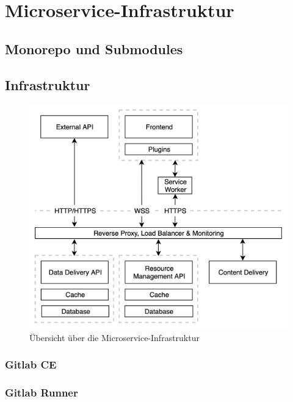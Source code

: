 \chapter{Microservice-Infrastruktur}
\label{chap:microserviceinfrastruktur}

\section{Monorepo und Submodules}
\label{sec:monorepoundsubmodules}

\section{Infrastruktur}
\label{sec:infrastruktur}

\begin{figure}
    \label{figure:microserviceinfrastruktur}
    \begin{center}
    \includegraphics[scale=0.2]{img/abbildungen/MicroserviceInfrastruktur}
    \end{center}
    \caption{Übersicht über die Microservice-Infrastruktur}
\end{figure}

\subsection{Gitlab CE}
\label{subsec:gitlabce}
\subsection{Gitlab Runner}
\label{subsec:gitlabrunner}

